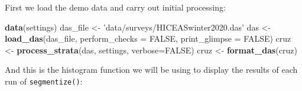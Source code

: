 \documentclass[
]{book}
\newenvironment{Shaded}{\begin{snugshade}}{\end{snugshade}}
\newcommand{\DataTypeTok}[1]{\textcolor[rgb]{0.13,0.29,0.53}{#1}}
\newcommand{\KeywordTok}[1]{\textcolor[rgb]{0.13,0.29,0.53}{\textbf{#1}}}
\newcommand{\NormalTok}[1]{#1}
\newcommand{\OtherTok}[1]{\textcolor[rgb]{0.56,0.35,0.01}{#1}}
\newcommand{\StringTok}[1]{\textcolor[rgb]{0.31,0.60,0.02}{#1}}
\begin{document}
First we load the demo data and carry out initial processing:

\begin{Shaded}
\begin{Highlighting}[]
\KeywordTok{data}\NormalTok{(settings)}
\NormalTok{das_file <-}\StringTok{ 'data/surveys/HICEASwinter2020.das'}
\NormalTok{das <-}\StringTok{ }\KeywordTok{load_das}\NormalTok{(das_file, }
                \DataTypeTok{perform_checks =} \OtherTok{FALSE}\NormalTok{,}
                \DataTypeTok{print_glimpse =} \OtherTok{FALSE}\NormalTok{)}
\NormalTok{cruz <-}\StringTok{ }\KeywordTok{process_strata}\NormalTok{(das,}
\NormalTok{                       settings,}
                       \DataTypeTok{verbose=}\OtherTok{FALSE}\NormalTok{)}
\NormalTok{cruz <-}\StringTok{ }\KeywordTok{format_das}\NormalTok{(cruz)}
\end{Highlighting}
\end{Shaded}

And this is the histogram function we will be using to display the results of each run of \texttt{segmentize()}:
\end{document}
